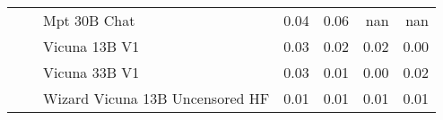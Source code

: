 \begin{table}[!htbp]
\begin{tabular}{l|l|l|rrrr}
 &  & Mpt 30B Chat & {\cellcolor[HTML]{D6E4F0}} \color[HTML]{000000} 0.04 & {\cellcolor[HTML]{BCD1E5}} \color[HTML]{000000} 0.06 & {\cellcolor[HTML]{000000}} \color[HTML]{F1F1F1} nan & {\cellcolor[HTML]{000000}} \color[HTML]{F1F1F1} nan \\
 &  & Vicuna 13B V1 & {\cellcolor[HTML]{E2EDF5}} \color[HTML]{000000} 0.03 & {\cellcolor[HTML]{E5EFF6}} \color[HTML]{000000} 0.02 & {\cellcolor[HTML]{ECF4F9}} \color[HTML]{000000} 0.02 & {\cellcolor[HTML]{F6FBFC}} \color[HTML]{000000} 0.00 \\
 &  & Vicuna 33B V1 & {\cellcolor[HTML]{DCE9F2}} \color[HTML]{000000} 0.03 & {\cellcolor[HTML]{EEF5F9}} \color[HTML]{000000} 0.01 & {\cellcolor[HTML]{F5FAFC}} \color[HTML]{000000} 0.00 & {\cellcolor[HTML]{ECF4F9}} \color[HTML]{000000} 0.02 \\
 &  & Wizard Vicuna 13B Uncensored HF & {\cellcolor[HTML]{EEF6FA}} \color[HTML]{000000} 0.01 & {\cellcolor[HTML]{EDF5F9}} \color[HTML]{000000} 0.01 & {\cellcolor[HTML]{F2F8FB}} \color[HTML]{000000} 0.01 & {\cellcolor[HTML]{F3F9FB}} \color[HTML]{000000} 0.01 \\
\bottomrule
\end{tabular}
            
\end{table}
